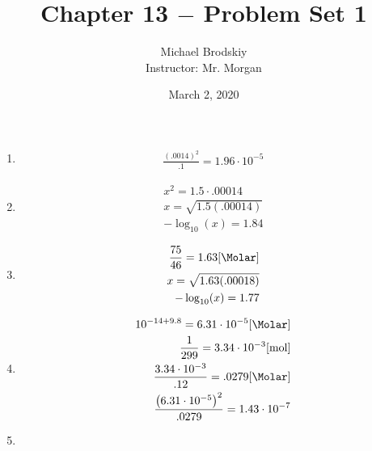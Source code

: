 \documentclass[12pt]{article}
\title{Chapter 13 $-$ Problem Set 1}
\date{March 2, 2020}
\author{Michael Brodskiy\\ \small Instructor: Mr. Morgan}
\begin{document}
\maketitle

\begin{enumerate}

  \item

    \begin{equation}
      \begin{split}
        \frac{(.0014)^2}{.1}=1.96\cdot10^{-5}
      \end{split}
      \label{1}
    \end{equation}

  \item

    \begin{equation}
      \begin{split}
        x^2=1.5\cdot.00014\\
        x=\sqrt{1.5(.00014)}\\
        -\log_{10}(x)=1.84
      \end{split}
      \label{2}
    \end{equation}

  \item

    \begin{equation}
      \begin{split}
        \frac{75}{46}=1.63[\si{\Molar}]\\
        x=\sqrt{1.63(.00018)}\\
        -\log_{10}(x)=1.77
      \end{split}
      \label{3}
    \end{equation}

  \item

    \begin{equation}
      \begin{split}
        10^{-14+9.8}=6.31\cdot10^{-5}[\si{\Molar}]\\
        \frac{1}{299}=3.34\cdot10^{-3}[\si{\mole}]\\
        \frac{3.34\cdot10^{-3}}{.12}=.0279[\si{\Molar}]\\
        \frac{\left(6.31\cdot10^{-5}\right)^2}{.0279}=1.43\cdot10^{-7}
      \end{split}
      \label{4}
    \end{equation}

  \item


\end{enumerate}
\end{document}

